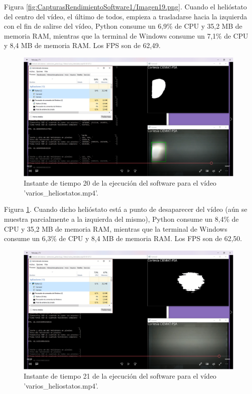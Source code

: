 Figura \ref{fig:CapturasRendimientoSoftware1/Imagen19.png}. Cuando el helióstato del centro del vídeo, el último de todos, empieza a trasladarse hacia la izquierda con el fin de salirse del vídeo, Python consume un 6,9\% de CPU y 35,2 MB de memoria RAM, mientras que la terminal de Windows consume un 7,1\% de CPU y 8,4 MB de memoria RAM. Los FPS son de 62,49.\\[20pt]

\begin{figure}[h!]
  	\centering
	\includegraphics[width=\textwidth]{CapturasRendimientoSoftware1/Imagen20.png}
	\caption{Instante de tiempo 20 de la ejecución del software para el vídeo 'varios\_heliostatos.mp4'.
	\label{fig:CapturasRendimientoSoftware1/Imagen20.png}}
\end{figure}

Figura \ref{fig:CapturasRendimientoSoftware1/Imagen20.png}. Cuando dicho helióstato está a punto de desaparecer del vídeo (aún se muestra parcialmente a la izquierda del mismo), Python consume un 8,4\% de CPU y 35,2 MB de memoria RAM, mientras que la terminal de Windows consume un 6,3\% de CPU y 8,4 MB de memoria RAM. Los FPS son de 62,50.\\[20pt]

\begin{figure}[h!]
  	\centering
	\includegraphics[width=\textwidth]{CapturasRendimientoSoftware1/Imagen21.png}
	\caption{Instante de tiempo 21 de la ejecución del software para el vídeo 'varios\_heliostatos.mp4'.
	\label{fig:CapturasRendimientoSoftware1/Imagen21.png}}
\end{figure}

